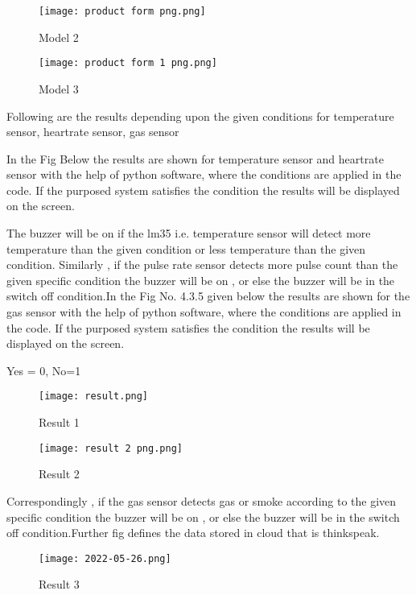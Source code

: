 \documentclass[12pt,a4paper]{report}
\begin{document}
\noindent \textbf{}


\begin{figure}[htp]
    \texttt{[image: product form png.png]}
    \caption{Model 2}
     
\end{figure}

\begin{figure}[htp]
    \texttt{[image: product form 1 png.png]}
    \caption{Model 3}

\end{figure}


\noindent Following are the results depending upon the given conditions for temperature sensor, heartrate sensor, gas sensor


\noindent 

\noindent In the Fig Below the results are shown for temperature sensor and heartrate sensor  with the help of python software, where the conditions are applied in the code. If the purposed system satisfies the condition the results will be displayed on the screen.

\noindent The buzzer  will be on if the  lm35 i.e. temperature sensor  will detect more temperature than the given condition  or  less temperature than the  given condition. Similarly , if the pulse rate sensor  detects more pulse count than the given specific condition the buzzer will be on , or else the buzzer will be in the switch off condition.In the  Fig No. 4.3.5 given below the results are shown for the gas sensor with the help of python software, where the conditions are applied in the code. If the purposed system satisfies the condition the results will be displayed on the screen.

\noindent  Yes = 0, No=1
\begin{figure}[htp]
    \texttt{[image: result.png]}
    \caption{Result 1}
     
\end{figure}

\begin{figure}[htp]
    \texttt{[image: result 2 png.png]}
    \caption{Result 2}

\end{figure}
\noindent Correspondingly , if the gas sensor  detects gas or smoke according to the given specific condition the buzzer will be on , or else the buzzer will be in the switch off condition.Further fig defines the data stored in cloud that is thinkspeak.

\begin{figure}[htp]
    \texttt{[image: 2022-05-26.png]}
    \caption{Result 3}
\end{figure}
\end{document}
